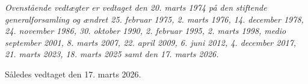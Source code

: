\documentclass[a4paper, 10pt]{article}
\def\vedtagsdato{den 17. marts 2026}
\begin{document}
\vspace{\fill}

\noindent \emph{Ovenstående vedtægter er vedtaget den 20. marts 1974
på den stiftende generalforsamling og ændret 25. februar 1975, 2.
marts 1976, 14. december 1978, 24. november 1986, 30.  oktober 1990,
2. februar 1995, 2. marts 1998, medio september 2001, 8. marts 2007,
22. april 2009, 6. juni 2012, 4. december 2017, 21. marts 2023, 18.
marts 2025 samt den 17. marts 2026.}

\bigskip

\noindent Således vedtaget \vedtagsdato{}.
\end{document}
